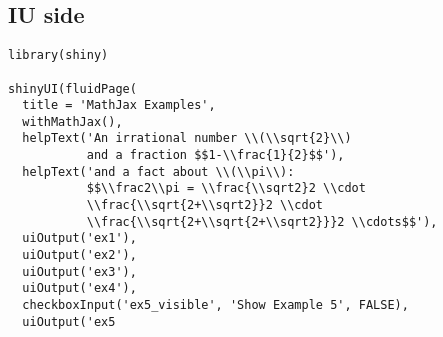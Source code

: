 \subsection*{IU side}

\begin{framed}
\begin{verbatim}
library(shiny)

shinyUI(fluidPage(
  title = 'MathJax Examples',
  withMathJax(),
  helpText('An irrational number \\(\\sqrt{2}\\)
           and a fraction $$1-\\frac{1}{2}$$'),
  helpText('and a fact about \\(\\pi\\):
           $$\\frac2\\pi = \\frac{\\sqrt2}2 \\cdot
           \\frac{\\sqrt{2+\\sqrt2}}2 \\cdot
           \\frac{\\sqrt{2+\\sqrt{2+\\sqrt2}}}2 \\cdots$$'),
  uiOutput('ex1'),
  uiOutput('ex2'),
  uiOutput('ex3'),
  uiOutput('ex4'),
  checkboxInput('ex5_visible', 'Show Example 5', FALSE),
  uiOutput('ex5\end{verbatim}
\end{framed}

